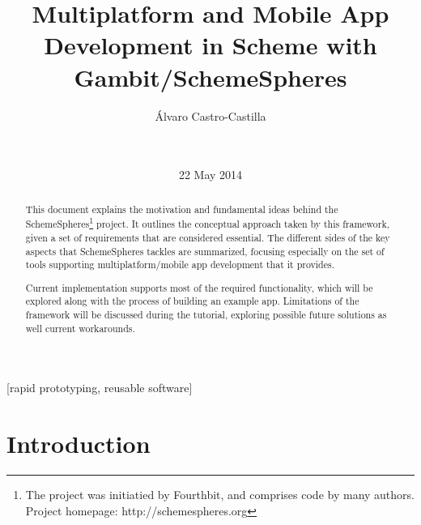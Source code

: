 \documentclass{acm_proc_article-sp}
\begin{document}
\title{Multiplatform and Mobile App Development in Scheme with Gambit/SchemeSpheres}

\author{
\alignauthor
Álvaro Castro-Castilla\\
       \\
       \\
}
\date{22 May 2014}

\maketitle
\begin{abstract}

This document explains the motivation and fundamental ideas behind the SchemeSpheres\footnote{The project was initiatied by Fourthbit, and comprises code by many authors. Project homepage: http://schemespheres.org} project. It outlines the conceptual approach taken by this framework, given a set of requirements that are considered essential. The different sides of the key aspects that SchemeSpheres tackles are summarized, focusing especially on the set of tools supporting multiplatform/mobile app development that it provides.

Current implementation supports most of the required functionality, which will be explored along with the process of building an example app. Limitations of the framework will be discussed during the tutorial, exploring possible future solutions as well current workarounds.

\end{abstract}

[rapid prototyping, reusable software]




\section{Introduction}
\end{document}
